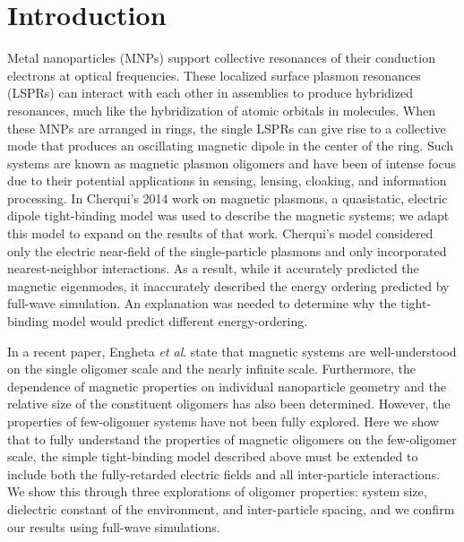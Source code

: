 \documentclass[journal=apchd5,manuscript=article]{achemso}
\begin{document}
\section{Introduction}
Metal nanoparticles (MNPs) support collective resonances of their conduction electrons at optical frequencies. These localized surface plasmon resonances (LSPRs) can interact with each other in assemblies to produce hybridized resonances, much like the hybridization of atomic orbitals in molecules\cite{Lucas1976,ARAVIND1981,Xu1995,Mischenko1995}. When these MNPs are arranged in rings, the single LSPRs can give rise to a collective mode that produces an oscillating magnetic dipole in the center of the ring\cite{Alu2006,Alu2008,Liu2011,Nord2006,Cherqui2014,Cherqui2016}. Such systems are known as magnetic plasmon oligomers and have been of intense focus due to their potential applications in sensing\cite{Zia2010trans,Noginova2008trans,Wang:13,Fan2015,Wei2015,Shvets2012,Altug2012bio,Nord2011fano}, lensing\cite{Fang2005,Valentine2008}, cloaking\cite{Shalaev2008}, and information processing\cite{Zhang2006,NordHal2011,NordHal2012}. In Cherqui's 2014 work on magnetic plasmons, a quasistatic, electric dipole tight-binding model was used to describe the magnetic systems\cite{Cherqui2014}; we adapt this model to expand on the results of that work. Cherqui's model considered only the electric near-field of the single-particle plasmons and only incorporated nearest-neighbor interactions. As a result, while it accurately predicted the magnetic eigenmodes, it inaccurately described the energy ordering predicted by full-wave simulation. An explanation was needed to determine why the tight-binding model would predict different energy-ordering.

In a recent paper, Engheta \textit{et al}. state that magnetic systems are well-understood on the single oligomer scale and the nearly infinite scale\cite{Engheta2017}. Furthermore, the dependence of magnetic properties on individual nanoparticle geometry and the relative size of the constituent oligomers has also been determined\cite{Cherqui2016}. However, the properties of few-oligomer systems have not been fully explored. Here we show that to fully understand the properties of magnetic oligomers on the few-oligomer scale, the simple tight-binding model described above must be extended to include both the fully-retarded electric fields and all inter-particle interactions. We show this through three explorations of oligomer properties: system size, dielectric constant of the environment, and inter-particle spacing, and we confirm our results using full-wave simulations\cite{Hohenester2012}.
\end{document}
